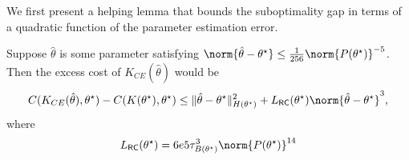 We first present a helping lemma that bounds the suboptimality gap in terms of a quadratic function of the parameter estimation error. 

\begin{lemma}
    \label{lem: CE upper bound}
    Suppose $\hat\theta$ is some parameter satisfying $\norm{\hat\theta-\theta^\star} \leq \frac{1}{256}\norm{P(\theta^\star)}^{-5}$. Then the excess cost of $K_{CE}(\hat\theta)$ would be
    \begin{align*}
        C(K_{CE}(\hat\theta), \theta^\star) - C(K(\theta^\star), \theta^\star) \leq \|\hat\theta - \theta^\star\|_{H(\theta^\star)}^2 +   L_{\mathsf{RC}}(\theta^\star)\norm{\hat\theta-\theta^\star}^3, 
    \end{align*}
    where 
    \begin{align*}
        L_{\mathsf{RC}}(\theta^\star) = 6e5\tau_{B(\theta^\star)}^3\norm{P(\theta^\star)}^{14}
    \end{align*}
\end{lemma}
